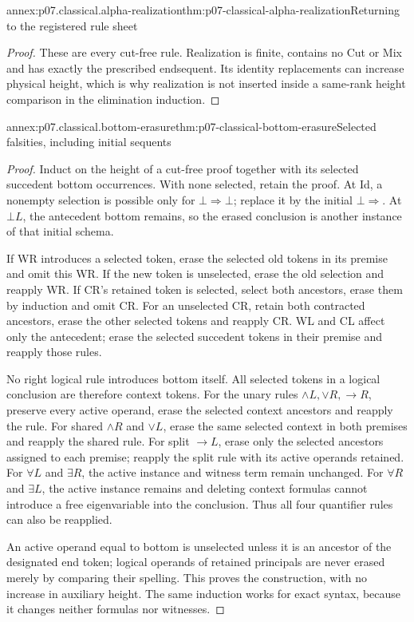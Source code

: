 \begin{annexitem}{annex:p07.classical.alpha-realization}{thm:p07-classical-alpha-realization}{Returning to the registered rule sheet}
\begin{proof}
These are every cut-free rule. Realization is finite, contains no Cut or
Mix and has exactly the prescribed endsequent. Its identity replacements
can increase physical height, which is why realization is not inserted
inside a same-rank height comparison in the elimination induction.
\end{proof}
\end{annexitem}

\begin{annexitem}{annex:p07.classical.bottom-erasure}{thm:p07-classical-bottom-erasure}{Selected falsities, including initial sequents}
\begin{proof}
Induct on the height of a cut-free proof together with its selected
succedent bottom occurrences. With none selected, retain the proof.
At Id, a nonempty selection is possible only for
\(\bot\Rightarrow\bot\); replace it by the initial
\(\bot\Rightarrow\). At \(\bot L\), the antecedent bottom remains,
so the erased conclusion is another instance of that initial schema.

If WR introduces a selected token, erase the selected old tokens in
its premise and omit this WR. If the new token is unselected, erase
the old selection and reapply WR. If CR's retained token is selected,
select both ancestors, erase them by induction and omit CR. For an
unselected CR, retain both contracted ancestors, erase the other selected
tokens and reapply CR. WL and CL affect only the antecedent; erase the
selected succedent tokens in their premise and reapply those rules.

No right logical rule introduces bottom itself. All selected tokens in
a logical conclusion are therefore context tokens. For the unary rules
\(\land L,\lor R,\to R\), preserve every active operand, erase the
selected context ancestors and reapply the rule. For shared \(\land R\)
and \(\lor L\), erase the same selected context in both premises and
reapply the shared rule. For split \(\to L\), erase only the selected
ancestors assigned to each premise; reapply the split rule with its active
operands retained. For \(\forall L\) and \(\exists R\), the active
instance and witness term remain unchanged. For \(\forall R\) and
\(\exists L\), the active instance remains and deleting context formulas
cannot introduce a free eigenvariable into the conclusion. Thus all four
quantifier rules can also be reapplied.

An active operand equal to bottom is unselected unless it is an ancestor
of the designated end token; logical operands of retained principals are
never erased merely by comparing their spelling. This proves the
construction, with no increase in auxiliary height. The same induction
works for exact syntax, because it changes neither formulas nor witnesses.
\end{proof}
\end{annexitem}

